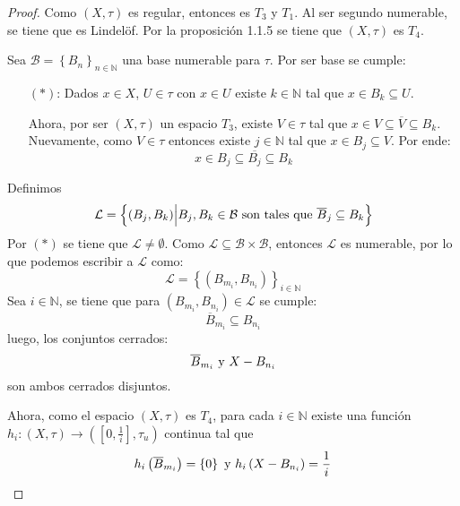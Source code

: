 \documentclass[12pt]{report}
\newcounter{it}
\theoremstyle{largebreak}
\newcommand\cf[3]{\ensuremath{#1:#2\rightarrow#3}}
\begin{document}
    \begin{proof}
        Como $(X,\tau)$ es regular, entonces es $T_3$ y $T_1$. Al ser segundo numerable, se tiene que es Lindelöf. Por la proposición 1.1.5 se tiene que $(X,\tau)$ es $T_4$.

        Sea $\mathcal{B}=\left\{B_n \right\}_{ n\in\mathbb{N}}$ una base numerable para $\tau$. Por ser base se cumple:
        \begin{itemize}
            \item[$(*)$:] Dados $x\in X$, $U\in\tau$ con $x\in U$ existe $k\in\mathbb{N}$ tal que $x\in B_k\subseteq U$.
            
            Ahora, por ser $(X,\tau)$ un espacio $T_3$, existe $V\in\tau$ tal que $x\in V\subseteq\overline{V}\subseteq B_k$. Nuevamente, como $V\in\tau$ entonces existe $j\in\mathbb{N}$ tal que $x\in B_j\subseteq V$. Por ende:
            \begin{equation*}
                x\in B_j\subseteq\overline{B_j}\subseteq B_k
            \end{equation*}
        \end{itemize}

        Definimos
        \begin{equation*}
            \mathcal{L}=\left\{(B_j,B_k)\Big|B_j,B_k\in\mathcal{B}\textup{ son tales que }\overline{B}_j\subseteq B_k \right\}
        \end{equation*}
        Por $(*)$ se tiene que $\mathcal{L}\neq\emptyset$. Como $\mathcal{L}\subseteq\mathcal{B}\times\mathcal{B}$, entonces $\mathcal{L}$ es numerable, por lo que podemos escribir a $\mathcal{L}$ como:
        \begin{equation*}
            \mathcal{L}=\left\{(B_{ m_i},B_{ n_i}) \right\}_{ i\in\mathbb{N}}
        \end{equation*}
        Sea $i\in\mathbb{N}$, se tiene que para $(B_{ m_i},B_{ n_i})\in\mathcal{L}$ se cumple:
        \begin{equation*}
            \overline{B}_{ m_i}\subseteq B_{ n_i}
        \end{equation*}
        luego, los conjuntos cerrados:
        \begin{equation*}
            \overline{B}_{ m_i}\textup{ y }X-B_{ n_i}
        \end{equation*}
        son ambos cerrados disjuntos.

        Ahora, como el espacio $(X,\tau)$ es $T_4$, para cada $i\in\mathbb{N}$ existe una función $\cf{h_i}{(X,\tau)}{(\left[0,\frac{1}{i}\right],\tau_u)}$ continua tal que
        \begin{equation*}
            h_i\left(\overline{B}_{ m_i}\right)=\left\{0\right\}\textup{ y }h_i\left(X-B_{ n_i}\right)=\frac{1}{i}
        \end{equation*}
        

\end{proof}
\end{document}
